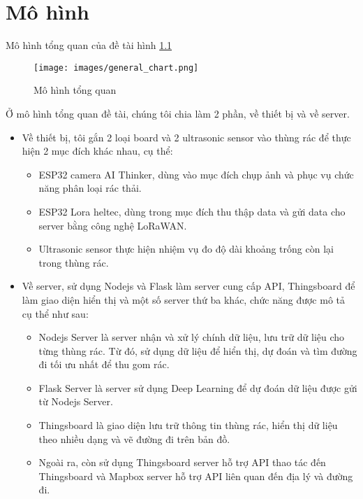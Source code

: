 
\chapter{ Mô hình}

Mô hình tổng quan của đề tài hình \ref{fig:general_chart}
\begin{figure}[H]
    \centering
    \texttt{[image: images/general\_chart.png]}
    \caption{Mô hình tổng quan}
    \label{fig:general_chart}
\end{figure}
Ở mô hình tổng quan đề tài, chúng tôi chia làm 2 phần, về thiết bị và về server.

\begin{itemize}
    \item Về thiết bị, tôi gắn 2 loại board và 2 ultrasonic sensor vào thùng rác để thực hiện 2 mục đích khác nhau, cụ thể:
        \begin{itemize}
            \item ESP32 camera AI Thinker, dùng vào mục đích chụp ảnh và phục vụ chức năng phân loại rác thải.
            \item  ESP32 Lora heltec, dùng trong mục đích thu thập data và gửi data cho server bằng công nghệ LoRaWAN.
            \item Ultrasonic sensor thực hiện nhiệm vụ đo độ dài khoảng trống còn lại trong thùng rác.
        \end{itemize}

    \item Về server, sử dụng Nodejs và Flask làm server cung cấp API, Thingsboard để làm giao diện hiển thị và một số server thứ ba khác, chức năng được mô tả cụ thể như sau:
        \begin{itemize}
            \item Nodejs Server là server nhận và xử lý chính dữ liệu, lưu trữ dữ liệu cho từng thùng rác. Từ đó, sử dụng dữ liệu để hiển thị, dự đoán và tìm đường đi tối ưu nhất để thu gom rác.
            \item Flask Server là server sử dụng Deep Learning để dự đoán dữ liệu được gửi từ Nodejs Server.
            \item Thingsboard là giao diện lưu trữ thông tin thùng rác, hiển thị dữ liệu theo nhiều dạng và vẽ đường đi trên bản đồ.
            \item Ngoài ra, còn sử dụng Thingsboard server hỗ trợ API thao tác đến Thingsboard và Mapbox server hỗ trợ API liên quan đến địa lý và đường đi.
        \end{itemize}
   

\end{itemize}


